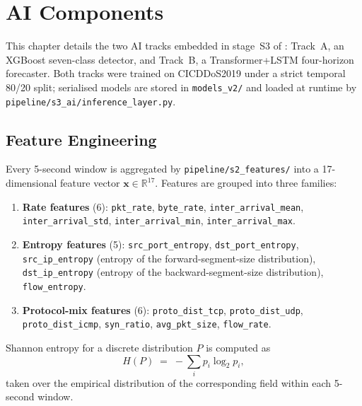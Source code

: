 \chapter{AI Components}
\label{ch:ai}

This chapter details the two AI tracks embedded in stage~S3 of \padonap{}:
Track~A, an XGBoost seven-class detector, and Track~B, a Transformer+LSTM
four-horizon forecaster. Both tracks were trained on CICDDoS2019 under a
strict temporal 80/20 split; serialised models are stored in
\texttt{models\_v2/} and loaded at runtime by
\texttt{pipeline/s3\_ai/inference\_layer.py}.

\section{Feature Engineering}
\label{sec:features}

Every 5-second window is aggregated by \texttt{pipeline/s2\_features/}
into a 17-dimensional feature vector $\mathbf{x} \in \mathbb{R}^{17}$.
Features are grouped into three families:

\begin{enumerate}
  \item \textbf{Rate features} (6): \texttt{pkt\_rate}, \texttt{byte\_rate},
        \texttt{inter\_arrival\_mean}, \texttt{inter\_arrival\_std},
        \texttt{inter\_arrival\_min}, \texttt{inter\_arrival\_max}.

  \item \textbf{Entropy features} (5): \texttt{src\_port\_entropy},
        \texttt{dst\_port\_entropy}, \texttt{src\_ip\_entropy}
        (entropy of the forward-segment-size distribution),
        \texttt{dst\_ip\_entropy} (entropy of the backward-segment-size
        distribution), \texttt{flow\_entropy}.

  \item \textbf{Protocol-mix features} (6): \texttt{proto\_dist\_tcp},
        \texttt{proto\_dist\_udp}, \texttt{proto\_dist\_icmp},
        \texttt{syn\_ratio}, \texttt{avg\_pkt\_size}, \texttt{flow\_rate}.
\end{enumerate}

Shannon entropy for a discrete distribution $P$ is computed as
\[
  H(P) \;=\; -\sum_i p_i \log_2 p_i,
\]
taken over the empirical distribution of the corresponding field within
each 5-second window.

